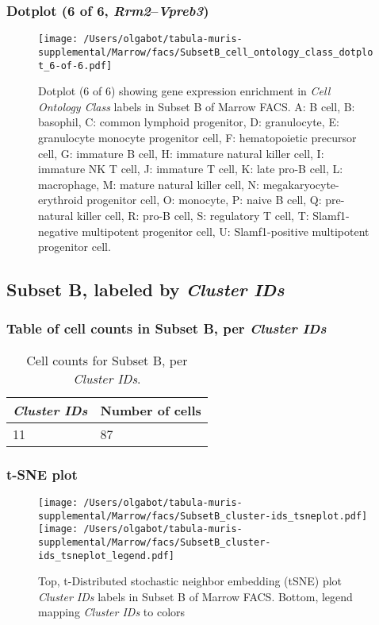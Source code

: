 \subsubsection{Dotplot (6 of 6, \emph{Rrm2}--\emph{Vpreb3})}
\begin{figure}[h]
\centering
\texttt{[image: /Users/olgabot/tabula-muris-supplemental/Marrow/facs/SubsetB\_cell\_ontology\_class\_dotplot\_6-of-6.pdf]}

\caption{ Dotplot (6 of 6)  showing gene expression enrichment in \emph{Cell Ontology Class} labels in Subset B of Marrow FACS. A: B cell, B: basophil, C: common lymphoid progenitor, D: granulocyte, E: granulocyte monocyte progenitor cell, F: hematopoietic precursor cell, G: immature B cell, H: immature natural killer cell, I: immature NK T cell, J: immature T cell, K: late pro-B cell, L: macrophage, M: mature natural killer cell, N: megakaryocyte-erythroid progenitor cell, O: monocyte, P: naive B cell, Q: pre-natural killer cell, R: pro-B cell, S: regulatory T cell, T: Slamf1-negative multipotent progenitor cell, U: Slamf1-positive multipotent progenitor cell.}
\end{figure}


\clearpage

\subsection{Subset B, labeled by \emph{Cluster IDs}}
\subsubsection{Table of cell counts in Subset B, per \emph{Cluster IDs}}\begin{table}[h]
\centering
\label{my-label}
\begin{tabular}{@{}ll@{}}
\toprule

\emph{Cluster IDs}& Number of cells \\ \midrule
11 & 87 \\
\bottomrule
\end{tabular}
\caption{Cell counts for Subset B, per \emph{Cluster IDs}.}
\end{table}

\clearpage
\subsubsection{t-SNE plot}
\begin{figure}[h]
\centering
\texttt{[image: /Users/olgabot/tabula-muris-supplemental/Marrow/facs/SubsetB\_cluster-ids\_tsneplot.pdf]}
\texttt{[image: /Users/olgabot/tabula-muris-supplemental/Marrow/facs/SubsetB\_cluster-ids\_tsneplot\_legend.pdf]}
\caption{Top, t-Distributed stochastic neighbor embedding (tSNE) plot  \emph{Cluster IDs} labels in Subset B of Marrow FACS. Bottom, legend mapping \emph{Cluster IDs} to colors}
\end{figure}


